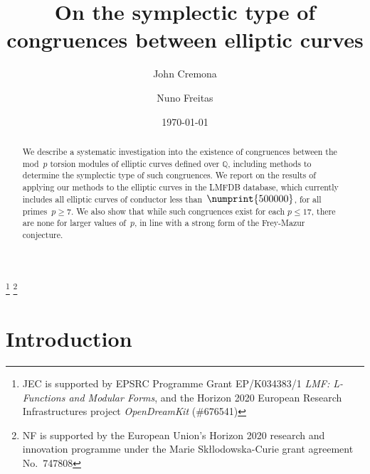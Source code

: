 \documentclass[12pt, reqno]{amsart}
\newcommand{\Q}{\mathbb{Q}}
\numberwithin{equation}{section}
\theoremstyle{definition}
\theoremstyle{remark}
\begin{document}
\title{On the symplectic type of congruences between elliptic curves} %

\author{John Cremona}
\address{Mathematics Institute,
         University of Warwick,
         Coventry CV4 7AL,
         United Kingdom}

\author{Nuno Freitas}
\address{Mathematics Institute,
         University of Warwick,
         Coventry CV4 7AL,
         United Kingdom}


\date{\today}


\thanks{JEC is supported by EPSRC Programme Grant EP/K034383/1
  \textit{LMF: L-Functions and Modular Forms}, and the Horizon 2020
  European Research Infrastructures project \textit{OpenDreamKit}
  (\#676541)}
\thanks{NF is supported by the European Union's
  Horizon 2020 research and innovation programme under the Marie
  Sk\l{l}odowska-Curie grant agreement No.\ 747808}


\begin{abstract}
We describe a systematic investigation into the existence of
congruences between the mod~$p$ torsion modules of elliptic curves
defined over $\Q$, including methods to determine the symplectic type
of such congruences.  We report on the results of applying our methods
to the elliptic curves in the LMFDB database, which currently includes
all elliptic curves of conductor less than~$\numprint{500000}$, for
all primes~$p\ge7$.  We also show that while such congruences exist
for each $p\le17$, there are none for larger values of~$p$, in line
with a strong form of the Frey-Mazur conjecture.
\end{abstract}

\maketitle


\section{Introduction}
\end{document}
